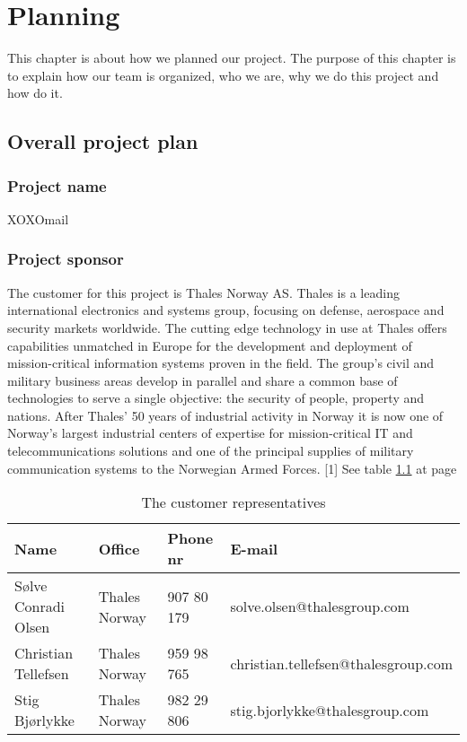 \chapter{Planning}

This chapter is about how we planned our project. The purpose of this chapter is to explain how our team is organized, who we are, why we do this project and how do it.

\section{Overall project plan}

\subsection{Project name}
XOXOmail

\subsection{Project sponsor}

The customer for this project is Thales Norway AS. Thales is a leading international electronics and systems group, focusing on defense, aerospace and security markets worldwide. The cutting edge technology in use at Thales offers capabilities unmatched in Europe for the development and deployment of mission-critical information systems proven in the field. The group’s civil and military business areas develop in parallel and share a common base of technologies to serve a single objective: the security of people, property and nations.
\newline
\newline
After Thales’ 50 years of industrial activity in Norway it is now one of Norway’s largest industrial centers of expertise for mission-critical IT and telecommunications solutions and one of the principal supplies of military communication systems to the Norwegian Armed Forces. [1]
\newline
\newline
See table \ref{tab:customer} at page \pageref{tab:customer}
\begin{table}
\begin{tabular}{l|l|l|l}
\textbf{Name} & \textbf{Office} & \textbf{Phone nr} & \textbf{E-mail} \\ \hline \hline
Sølve Conradi Olsen & Thales Norway & 907 80 179 & solve.olsen@thalesgroup.com \\ \hline
Christian Tellefsen & Thales Norway & 959 98 765 & christian.tellefsen@thalesgroup.com \\ \hline
Stig Bjørlykke & Thales Norway & 982 29 806 & stig.bjorlykke@thalesgroup.com
\end{tabular}
\caption{The customer representatives} \label{tab:customer}
\end{table}

